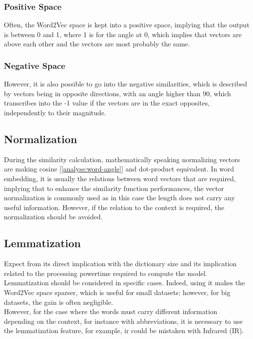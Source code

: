 \subsubsection{Positive Space}
Often, the Word2Vec space is kept into a positive space, implying that the output is between 0 and 1, where 1 is for the angle at 0\textdegree, which implies that vectors are above each other and the vectors are most probably the same.

\subsubsection{Negative Space}
However, it is also possible to go into the negative similarities, which is described by vectors being in opposite directions, with an angle higher than 90\textdegree, which transcribes into the -1 value if the vectors are in the exact opposites, independently to their magnitude. 


\subsection{Normalization}
\label{analyse:normalization}
During the similarity calculation, mathematically speaking normalizing vectors are making cosine [\ref{analyse:word-angle}] and dot-product equivalent. In word embedding, it is usually the relations between word vectors that are required, implying that to enhance the similarity function performances, the vector normalization is commonly used as in this case the length does not carry any useful information. However, if the relation to the context is required, the normalization should be avoided. 


\subsection{Lemmatization}
\label{analyse:lemmatization}
Expect from its direct implication with the dictionary size and its implication related to the processing power\/time required to compute the model. Lemmatization should be considered in specific cases. Indeed, using it makes the Word2Vec space sparser, which is useful for small datasets; however, for big datasets, the gain is often negligible. \\

However, for the case where the words must carry different information depending on the context, for instance with abbreviations, it is necessary to use the lemmatization feature, for example, \gls{ir} could be mistaken with Infrared (IR).\\

